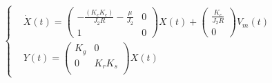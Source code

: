 \begin{align}
\label{EE2}
\left\lbrace
\begin{aligned}
&\dot{X}(t) = \begin{pmatrix}
-\frac{(K_cK_e)}{J_2R}-\frac{\mu}{J_2}	&	0\\
1&	0
\end{pmatrix}X(t)+\begin{pmatrix}
\frac{K_c}{J_2R}\\0
\end{pmatrix}V_m(t)\\
&Y(t) = \begin{pmatrix}
K_g	&	0\\
0	&	K_rK_s\\
\end{pmatrix}X(t)
\end{aligned}
\right.
\end{align}